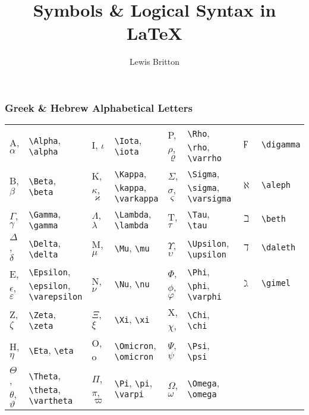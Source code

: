 \documentclass[10pt, english]{article}
\begin{document}

	\title{Symbols \& Logical Syntax in {\LaTeX}}
	\author{Lewis Britton}
	\date{}
	\maketitle

\subsubsection*{Greek \& Hebrew Alphabetical Letters}

	\begin{center}
		\scriptsize
	\begin{tabular}{ll|ll|ll|ll}
		A, $\alpha$ & \verb|\Alpha|, \verb|\alpha| & I, $\iota$ & \verb|\Iota|, \verb|\iota| & P, $\rho$, $\varrho$ & \verb|\Rho|, \verb|\rho|, \verb|\varrho| & $\digamma$ & \verb|\digamma| \\
		B, $\beta$ & \verb|\Beta|, \verb|\beta| & K, $\kappa$, $\varkappa$ & \verb|\Kappa|, \verb|\kappa|, \verb|\varkappa| & $\Sigma$, $\sigma$, $\varsigma$ & \verb|\Sigma|, \verb|\sigma|, \verb|\varsigma| & $\aleph$ & \verb|\aleph| \\
		$\Gamma$, $\gamma$ & \verb|\Gamma|, \verb|\gamma| & $\Lambda$, $\lambda$ & \verb|\Lambda|, \verb|\lambda| & T, $\tau$ & \verb|\Tau|, \verb|\tau| & $\beth$ & \verb|\beth| \\
		$\Delta$, $\delta$ & \verb|\Delta|, \verb|\delta| & M, $\mu$ & \verb|\Mu|, \verb|\mu| & $\Upsilon$, $\upsilon$ & \verb|\Upsilon|, \verb|\upsilon| & $\daleth$ & \verb|\daleth|\\
		E, $\epsilon$, $\varepsilon$ & \verb|\Epsilon|, \verb|\epsilon|, \verb|\varepsilon| & N, $\nu$ & \verb|\Nu|, \verb|\nu| & $\Phi$, $\phi$, $\varphi$ & \verb|\Phi|, \verb|\phi|, \verb|\varphi| & $\gimel$ & \verb|\gimel| \\
		Z, $\zeta$ & \verb|\Zeta|, \verb|\zeta| & $\Xi$, $\xi$ & \verb|\Xi|, \verb|\xi| & X, $\chi$, & \verb|\Chi|, \verb|\chi| \\
		H, $\eta$ & \verb|\Eta|, \verb|\eta| & O, o & \verb|\Omicron|, \verb|\omicron| & $\Psi$, $\psi$ & \verb|\Psi|, \verb|\psi| \\
		$\Theta$, $\theta$, $\vartheta$ & \verb|\Theta|, \verb|\theta|, \verb|\vartheta| & $\Pi$, $\pi$, $\varpi$ & \verb|\Pi|, \verb|\pi|, \verb|\varpi| & $\Omega$, $\omega$ & \verb|\Omega|, \verb|\omega| \\
	\end{tabular}
	\end{center}
\end{document}
